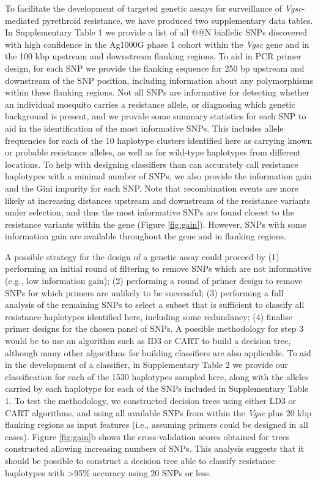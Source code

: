 \documentclass[a4paper,11pt,abstracton,hidelinks]{scrartcl}
\begin{document}
%
To facilitate the development of targeted genetic assays for surveillance of \textit{Vgsc}-mediated pyrethroid resistance, we have produced two supplementary data tables.
%
In Supplementary Table 1 we provide a list of all @@N biallelic SNPs discovered with high confidence in the Ag1000G phase 1 cohort within the \textit{Vgsc} gene and in the 100 kbp upstream and downstream flanking regions.
%
To aid in PCR primer design, for each SNP we provide the flanking sequence for 250 bp upstream and downstream of the SNP position, including information about any polymorphisms within these flanking regions.
%
Not all SNPs are informative for detecting whether an individual mosquito carries a resistance allele, or diagnosing which genetic background is present, and we provide some summary statistics for each SNP to aid in the identification of the most informative SNPs.
%
This includes allele frequencies for each of the 10 haplotype clusters identified here as carrying known or probable resistance alleles, as well as for wild-type haplotypes from different locations.
%
To help with designing classifiers than can accurately call resistance haplotypes with a minimal number of SNPs, we also provide the information gain \cite{Quinlan1986} and the Gini impurity \cite{Breiman1984} for each SNP.
%
Note that recombination events are more likely at increasing distances upstream and downstream of the resistance variants under selection, and thus the most informative SNPs are found closest to the resistance variants within the gene (Figure \ref{fig:gain}).
%
However, SNPs with some information gain are available throughout the gene and in flanking regions.
%


%
A possible strategy for the design of a genetic assay could proceed by (1) performing an initial round of filtering to remove SNPs which are not informative (e.g., low information gain); (2) performing a round of primer design to remove SNPs for which primers are unlikely to be successful; (3) performing a full analysis of the remaining SNPs to select a subset that is sufficient to classify all resistance haplotypes identified here, including some redundancy; (4) finalise primer designs for the chosen panel of SNPs.
%
A possible methodology for step 3 would be to use an algorithm such as ID3 \cite{Quinlan1986} or CART \cite{Breiman1984} to build a decision tree, although many other algorithms for building classifiers are also applicable.
%
To aid in the development of a classifier, in Supplementary Table 2 we provide our classification for each of the 1530 haplotypes sampled here, along with the alleles carried by each haplotype for each of the SNPs included in Supplementary Table 1.
%
To test the methodology, we constructed decision trees using either LD3 or CART algorithms, and using all available SNPs from within the \textit{Vgsc} plus 20 kbp flanking regions as input features (i.e., assuming primers could be designed in all cases).
%
Figure \ref{fig:gain}b shows the cross-validation scores obtained for trees constructed allowing increasing numbers of SNPs.
%
This analysis suggests that it should be possible to construct a decision tree able to classify resistance haplotypes with >95\% accuracy using 20 SNPs or less.
\end{document}
